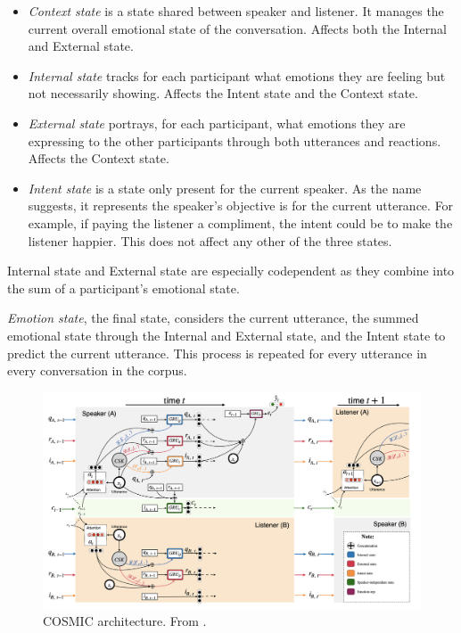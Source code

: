 \documentclass[nofilelist]{cslthse-msc}
\begin{document}
\begin{itemize}
    \item \textit{Context state} is a state shared between speaker and listener. It manages the current overall emotional state of the conversation. Affects both the Internal and External state.
    \item \textit{Internal state} tracks for each participant what emotions they are feeling but not necessarily showing. Affects the Intent state and the Context state.
    \item \textit{External state} portrays, for each participant, what emotions they are expressing to the other participants through both utterances and reactions. Affects the Context state.
    \item \textit{Intent state} is a state only present for the current speaker. As the name suggests, it represents the speaker's objective is for the current utterance. For example, if paying the listener a compliment, the intent could be to make the listener happier. This does not affect any other of the three states.
\end{itemize}
Internal state and External state are especially codependent as they combine into the sum of a participant's emotional state. 

\emph{Emotion state}, the final state, considers the current utterance, the summed emotional state through the Internal and External state, and the Intent state to predict the current utterance. This process is repeated for every utterance in every conversation in the corpus.



\begin{figure}[!ht]
    \centering
    \includegraphics[scale=0.3]{msccls/explanatory_images/COSMIC_arch.png}
    \caption{COSMIC architecture. From \citet{ghosal2020cosmic}.}
    \label{fig:COSMIC_arch}
\end{figure}
\end{document}
